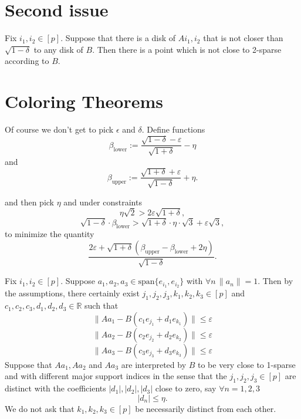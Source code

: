 \documentclass[11pt]{amsart}
\newcommand{\R}{\mathbb{R}}
\begin{document}
\section{Second issue}
Fix $i_1, i_2 \in [p]$. Suppose that there is a disk of $A{i_1,i_2}$ that is not closer than $\sqrt{1-\delta}$ to any disk of $B$.  
Then there is a point which is not close to 2-sparse according to $B$.

\section{Coloring Theorems}
Of course we don't get to pick $\epsilon$ and $\delta$.  Define functions 
\[\beta_\text{lower}:= \frac{\sqrt{1-\delta}-\varepsilon}{\sqrt{1+\delta}} - \eta\] and
\[\beta_\text{upper}:= \frac{\sqrt{1+\delta}+\varepsilon}{\sqrt{1-\delta}} + \eta.\]

and then pick $\eta$ and under constraints
\[\eta \sqrt{2} > 2\varepsilon\sqrt{1+\delta} ,\]
\[\sqrt{1-\delta} \cdot \beta_\text{lower} > \sqrt{1+\delta} \cdot \eta \cdot \sqrt{3}+ \varepsilon \sqrt{3},\] to minimize the quantity
\[\frac{2 \varepsilon + \sqrt{1+\delta} \left(\beta_\text{upper}-\beta_\text{lower} +2\eta\right)}{\sqrt{1-\delta}} .\] 

Fix $i_1, i_2 \in [p]$.  Suppose $a_1, a_2, a_3\in \text{span}\{e_{i_1}, e_{i_2}\}$ with $\forall n\, \|a_n\|=1$.
Then by the assumptions, there certainly exist $j_1, j_2, j_3,k_1, k_2, k_3\in [p]$ and $c_1,c_2,c_3, d_1, d_2, d_3 \in \R$ such that
\[\|Aa_1 - B(c_1e_{j_1}+d_1 e_{k_1})\|\leq \varepsilon \]   
\[\|Aa_2 - B(c_2e_{j_2}+d_2 e_{k_2})\|\leq \varepsilon \]   
\[\|Aa_3 - B(c_3e_{j_3}+d_3 e_{k_3})\|\leq \varepsilon \]   
Suppose that $Aa_1, A a_2$ and $Aa_3$ are interpreted by $B$ to be very close to 1-sparse and 
with different major support indices in the sense that the
 $j_1, j_2, j_3\in [p]$ are distinct with the coefficients $|d_1|, |d_2|, |d_3|$ close to zero, say $\forall n=1,2,3$
\[|d_n| \leq \eta.\] 
We do not ask that $k_1, k_2, k_3\in [p]$ be necessarily distinct from each other.  
\end{document}
